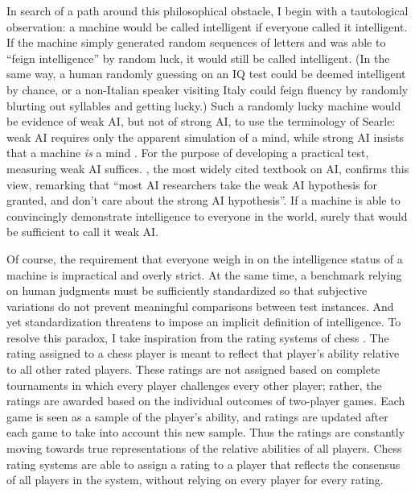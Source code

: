 In search of a path around this philosophical obstacle, I begin with a tautological observation: a machine would be called intelligent if everyone called it intelligent. If the machine simply generated random sequences of letters and was able to ``feign intelligence'' by random luck, it would still be called intelligent. (In the same way, a human randomly guessing on an IQ test could be deemed intelligent by chance, or a non-Italian speaker visiting Italy could feign fluency by randomly blurting out syllables and getting lucky.) Such a randomly lucky machine would be evidence of weak AI, but not of strong AI, to use the terminology of Searle: weak AI requires only the apparent simulation of a mind, while strong AI insists that a machine \textit{is} a mind \citep{searle1980minds}. For the purpose of developing a practical test, measuring weak AI suffices. \citet{russell1995modern}, the most widely cited textbook on AI, confirms this view, remarking that ``most AI researchers take the weak AI hypothesis for granted, and don't care about the strong AI hypothesis''. If a machine is able to convincingly demonstrate intelligence to everyone in the world, surely that would be sufficient to call it weak AI.

Of course, the requirement that everyone weigh in on the intelligence status of a machine is impractical and overly strict. At the same time, a benchmark relying on human judgments must be sufficiently standardized so that subjective variations do not prevent meaningful comparisons between test instances. And yet standardization threatens to impose an implicit definition of intelligence. To resolve this paradox, I take inspiration from the rating systems of chess  \citep{glickman1995chess}. The rating assigned to a chess player is meant to reflect that player's ability relative to all other rated players. These ratings are not assigned based on complete tournaments in which every player challenges every other player; rather, the ratings are awarded based on the individual outcomes of two-player games. Each game is seen as a sample of the player's ability, and ratings are updated after each game to take into account this new sample. Thus the ratings are constantly moving towards true representations of the relative abilities of all players. Chess rating systems are able to assign a rating to a player that reflects the consensus of all players in the system, without relying on every player for every rating.

